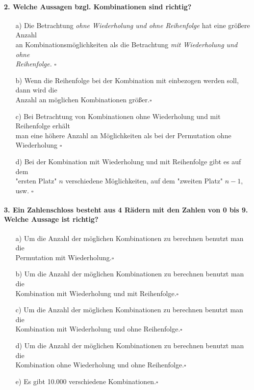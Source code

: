 \documentclass[a4paper]{article}
\begin{document}
\paragraph{2. Welche Aussagen bzgl. Kombinationen sind richtig?}
\begin{itemize}
    \item [a)] Die Betrachtung \textit{ohne Wiederholung und ohne Reihenfolge} hat eine größere Anzahl \\ an Kombinationsmöglichkeiten als die Betrachtung \textit{mit Wiederholung und ohne \\Reihenfolge.} \hfill $\square$
    \item[b)] Wenn die Reihenfolge bei der Kombination mit einbezogen werden soll, dann wird die \\Anzahl an möglichen Kombinationen größer.\hfill $\square$
    \item[c)] Bei Betrachtung von Kombinationen ohne Wiederholung und mit Reihenfolge erhält\\ man eine höhere Anzahl an Möglichkeiten als bei der Permutation ohne Wiederholung \hfill $\square$
    \item[d)] Bei der Kombination mit Wiederholung und mit Reihenfolge gibt es auf dem \\"ersten Platz" $n$ verschiedene Möglichkeiten, auf dem "zweiten Platz" $n-1$, usw. \hfill $\square$
\end{itemize}

\paragraph{3. Ein Zahlenschloss besteht aus 4 Rädern mit den Zahlen von 0 bis 9. Welche Aussage ist richtig?}
\begin{itemize}
    \item[a)]Um die Anzahl der möglichen Kombinationen zu berechnen benutzt man die\\ Permutation mit Wiederholung.\hfill $\square$
    \item[b)]Um die Anzahl der möglichen Kombinationen zu berechnen benutzt man die\\ Kombination mit Wiederholung und mit Reihenfolge.\hfill $\square$
    \item[c)]Um die Anzahl der möglichen Kombinationen zu berechnen benutzt man die\\ Kombination mit Wiederholung und ohne Reihenfolge.\hfill $\square$
    \item[d)]Um die Anzahl der möglichen Kombinationen zu berechnen benutzt man die\\ Kombination ohne Wiederholung und ohne Reihenfolge.\hfill $\square$
    \item[e)]Es gibt 10.000 verschiedene Kombinationen.\hfill $\square$
\end{itemize}
\end{document}
